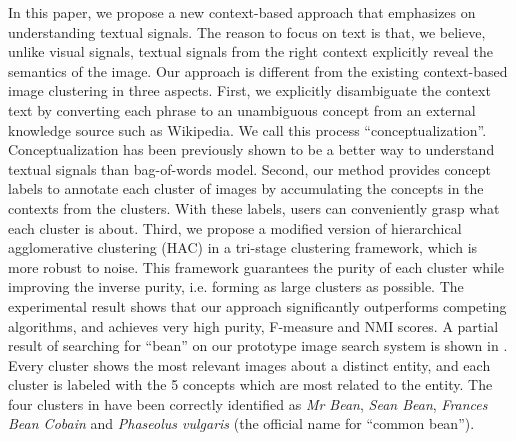In this paper, we propose a new context-based approach that
emphasizes on understanding textual signals.
The reason to focus on text is that, we believe, unlike visual signals,
textual signals from the right context explicitly reveal
the semantics of the image.
Our approach is different from the existing context-based image clustering
in three aspects. First, we explicitly disambiguate the context text
by converting each phrase to an unambiguous concept from an
external knowledge source such as Wikipedia.
We call this process ``conceptualization''.
Conceptualization has been previously shown
to be a better way to understand
textual signals than bag-of-words model\cite{Song11:Conceptualize}.
Second, our method provides concept labels to annotate
each cluster of images by accumulating the concepts in the contexts
from the clusters.
With these labels, users can conveniently grasp what each
cluster is about. Third, we propose a modified version of
hierarchical agglomerative clustering (HAC) in a tri-stage clustering
framework, which is more robust to noise.
This framework guarantees the purity of each cluster while
improving the inverse purity, i.e. forming as large clusters as possible.
The experimental result shows that our approach significantly outperforms
competing algorithms, and achieves very high purity, F-measure and
NMI scores.
%
A partial result of searching for ``bean'' on our prototype image search system
is shown in .
Every cluster shows the
most relevant images about a distinct entity, and each cluster is labeled with
the 5 concepts which are most related to the entity.
The four clusters in  have been correctly identified
as {\em Mr Bean}, {\em Sean Bean}, {\em Frances Bean Cobain} and
{\em Phaseolus vulgaris}
(the official name for ``common bean'').

